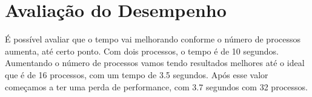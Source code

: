\section{Avaliação do Desempenho}

	É possível avaliar que o tempo vai melhorando conforme o número de processos aumenta, até certo ponto. Com dois processos, o tempo é de 10 segundos. Aumentando o número de processos vamos tendo resultados melhores até o ideal que é de 16 processos, com um tempo de 3.5 segundos. Após esse valor começamos a ter uma perda de performance, com 3.7 segundos com 32 processos.
